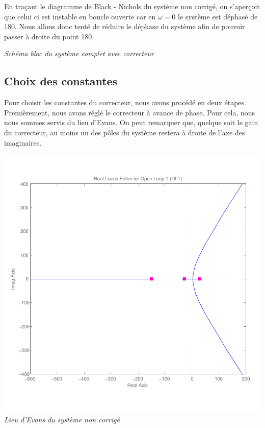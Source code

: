 \documentclass[11pt, french]{article} %
\begin{document}
\medskip
En traçant le diagramme de Black - Nichols du système non corrigé, on s'aperçoit que celui ci est instable en boucle ouverte car en $\omega = 0$ le système est déphasé de 180. Nous allons donc tenté de réduire le déphase du système afin de pouvoir passer à droite du point 180.

\medskip
\begin{center}

\emph{Schéma bloc du système complet avec correcteur}
\end{center}

\subsection{Choix des constantes}

Pour choisir les constantes du correcteur, nous avons procédé en deux étapes. Premièrement, nous avons réglé le correcteur à avance de phase. Pour cela, nous nous sommes servis du lieu d'Evans. On peut remarquer que, quelque soit le gain du correcteur, au moins un des pôles du système restera à droite de l'axe des imaginaires.

\begin{center}
\includegraphics [scale=0.50]{RL_Sys_Seul.pdf}
\\
\emph{Lieu d'Evans du système non corrigé}
\end{center}
\end{document}
